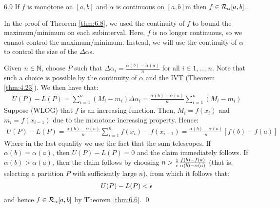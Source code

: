 \begin{theorem}{}{6.9}
    If $f$ is monotone on $[a, b]$ and $\alpha$ is continuous on $[a, b]$m then $f \in \mathcal{R}_\alpha[a, b]$. 
\end{theorem}
\noindent In the proof of Theorem \ref{thm:6.8}, we used the continuity of $f$ to bound the maximum/minimum on each subinterval. Here, $f$ is no longer continuous, so we cannot control the maximum/minimum. Instead, we will use the continuity of $\alpha$ to control the size of the $\Delta \alpha$s. 
\begin{nproof}
    Given $n \in \mathbb{N}$, choose $P$ such that $\Delta \alpha_i = \frac{\alpha(b) - \alpha(a)}{n}$ for all $i \in {1, \ldots, n}$. Note that such a choice is possible by the continuity of $\alpha$ and the IVT (Theorem \ref{thm:4.23}). We then have that:
    \begin{align*}
        U(P) - L(P) = \sum_{i=1}^n (M_i - m_i)\Delta \alpha_i = \frac{\alpha(b) - \alpha(a)}{n}\sum_{i=1}^n (M_i - m_i)
    \end{align*}
    Suppose (WLOG) that $f$ is an increasing function. Then, $M_i = f(x_i)$ and $m_i = f(x_{i-1})$ due to the monotone increasing property. Hence:
    \begin{align*}
        U(P) - L(P) = \frac{\alpha(b) - \alpha(a)}{n}\sum_{i=1}^n f(x_i) - f(x_{i-1}) = \frac{\alpha(b) - \alpha(a)}{n}\left[f(b) - f(a)\right]
    \end{align*}
    Where in the last equality we use the fact that the sum telescopes. If $\alpha(b) = \alpha(a)$, then $U(P) - L(P) = 0$ and the claim immediately follows. If $\alpha(b) > \alpha(a)$, then the claim follows by choosing $n > \frac{1}{\epsilon}\frac{f(b) - f(a)}{\alpha(b) - \alpha(a)}$ (that is, selecting a partition $P$ with sufficiently large $n$), from which it follows that:
    \begin{align*}
        U(P) - L(P) < \epsilon
    \end{align*}
    and hence $f \in \mathcal{R}_\alpha[a, b]$ by Theorem \ref{thm:6.6}. \qed
\end{nproof}

